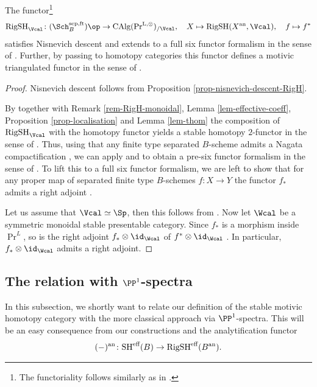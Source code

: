 \documentclass[colorinlistoftodos,article,11pt,reqno]{article}
\newcommand{\RigSH}{\textup{RigSH}}
\newcommand{\eff}{\textup{eff}}
\newcommand{\an}{\textup{an}}
\renewcommand{\to}[1][]{\overset{#1}{\rightarrow}}
\newcommand{\PrLO}{\textup{Pr}^{\textup{L},\otimes}}
\newcommand{\CAlgPr}{\textup{CAlg}(\PrLO)}
\begin{document}
\begin{thm}
\label{thm-6ff}
The functor\footnote{The functoriality follows similarly as in \cite[\S 9.1]{RobaloDiss}.} 
\begin{align*}
	\RigSH_{\Vcal}\colon (\Sch^{\textup{sep,ft}}_{B})\op\rightarrow \CAlgPr_{/\Vcal},\quad X\mapsto \RigSH(X^{\an},\Vcal),\quad f\mapsto f^{*}
\end{align*}
satisfies Nisnevich descent and extends to a full six functor formalism in the sense of \cite{Liu-Zheng}. Further, by passing to homotopy categories this functor defines a motivic triangulated functor in the sense of \cite{CD1}.
\end{thm}
\begin{proof}
    Nisnevich descent follows from Proposition \ref{prop-nisnevich-descent-RigH}.

    By \cite[Prop. 5.11]{DrewMHM} together with Remark \ref{rem-RigH-monoidal}, Lemma \ref{lem-effective-coeff}, Proposition \ref{prop-localisation} and Lemma \ref{lem-thom} the composition of $\RigSH_{\Vcal}$ with the homotopy functor yields a stable homotopy $2$-functor in the sense of \cite[\S 1.4.1]{AyoubThesis}. Thus, using that any finite type separated $B$-scheme admits a Nagata compactification \cite[Thm. 4.1]{NagataComp}, we can apply \cite[Thm. 2.4.26]{CD1} and \cite[Prop A.5.10]{Mann-Thesis} to obtain a pre-six functor formalism in the sense of \cite{Mann-Thesis}. To lift this to a full six functor formalism, we are left to show that for any proper map of separated finite type $B$-schemes $f\colon X\rightarrow Y$ the functor $f_*$ admits a right adjoint \cite[Prop. A.5.10]{Mann-Thesis}. 
    
    Let us assume that $\Vcal\simeq \Sp$, then this follows from \cite[Prop. 5.17]{DrewMHM}. Now let $\Wcal$ be a symmetric monoidal stable presentable category. Since $f_{*}$ is a morphism inside $\Pr^{L}$, so is the right adjoint $f_{*}\otimes \id_{\Wcal}$ of $f^{*}\otimes \id_{\Wcal}$ \cite[Lem. 8.4]{DrewMHM}. In particular, $f_{*}\otimes \id_{\Wcal}$ admits a right adjoint.
\end{proof}

\subsection{The relation with $\PP^1$-spectra}
\label{sec-RigSH-as-spectra}

In this subsection, we shortly want to relate our definition of the stable motivic homotopy category with the more classical approach via $\PP^1$-spectra. This will be an easy consequence from our constructions and the analytification functor
$$
    (-)^{\an}\colon \textup{SH}^{\eff}(B)\to \RigSH^{\eff}(B^\an).
$$
\end{document}

